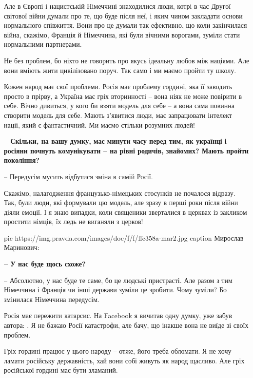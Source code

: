 Але в Європі і нацистській Німеччині знаходилися люди, котрі в час Другої
світової війни думали про те, що буде після неї, і яким чином закладати основи
нормального співжиття. Вони про це думали так ефективно, що коли закінчилася
війна, скажімо, Франція й Німеччина, які були вічними ворогами, зуміли стати
нормальними партнерами. 

Не без проблем, бо ніхто не говорить про якусь ідеальну любов між націями. Але
вони вміють жити цивілізовано поруч. Так само і ми маємо пройти ту школу. 

Кожен народ має свої проблеми. Росія має проблему гордині, яка її заводить
просто в прірву, а Україна має гріх вторинності – вона ніяк не може повірити в
себе. Вічно дивиться, у кого би взяти модель для себе – а вона сама повинна
створити модель для себе. Мають з’явитися люди, має  запрацювати інтелект
нації, який є фантастичний. Ми маємо стільки розумних людей!

\textbf{– Скільки, на вашу думку, має минути часу перед тим, як українці і росіяни
почнуть комунікувати – на рівні родичів, знайомих? Мають пройти покоління?}

– Передусім мусить відбутися зміна в самій Росії. 

Скажімо, налагодження французько-німецьких стосунків не почалося відразу. Так,
були люди, які формували цю модель, але зразу в перші роки після війни діяли
емоції. І я знаю випадки, коли священики зверталися в церквах із закликом
простити німців, їх ледь не виганяли з церков!

\ifcmt
pic https://img.pravda.com/images/doc/f/f/ffc358a-mar2.jpg
caption Мирослав Маринович: 
\fi

{\bfseries 
– У нас буде щось схоже? 
}

– Абсолютно, у нас буде те саме, бо це людські пристрасті. Але разом з тим
Німеччина і Франція чи інші держави зуміли це зробити. Чому зуміли? Бо
змінилася Німеччина передусім. 

Росія має пережити катарсис. На Facebook я вичитав одну думку, уже забув
автора: . Я не бажаю Росії катастрофи, але бачу, що інакше вона
не виїде зі своїх проблем. 

Гріх гордині працює у цього народу – отже, його треба обломати. Я не хочу
ламати російську державність, хай вони собі живуть як народ щасливо. Але гріх
російської гордині має бути зламаний.


